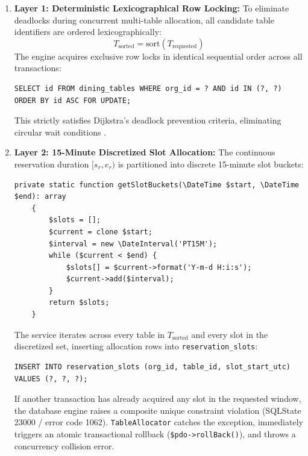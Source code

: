 \begin{enumerate}
    \item \textbf{Layer 1: Deterministic Lexicographical Row Locking:} To eliminate deadlocks during concurrent multi-table allocation, all candidate table identifiers are ordered lexicographically:
    \begin{equation}
        T_{\text{sorted}} = \text{sort}(T_{\text{requested}})
    \end{equation}
    The engine acquires exclusive row locks in identical sequential order across all transactions:
    \begin{lstlisting}[language=SQLANSI]
    SELECT id FROM dining_tables WHERE org_id = ? AND id IN (?, ?) ORDER BY id ASC FOR UPDATE;
    \end{lstlisting}
    This strictly satisfies Dijkstra's deadlock prevention criteria, eliminating circular wait conditions \parencite{bernstein1987concurrency}.
    \item \textbf{Layer 2: 15-Minute Discretized Slot Allocation:} The continuous reservation duration $[s_r, e_r)$ is partitioned into discrete 15-minute slot buckets:
    \begin{lstlisting}[language=PHPStrict, caption={15-minute slot discretization algorithm in \texttt{src/app/Services/TableAllocator.php}}, label={lst:slot_discretization}]
    private static function getSlotBuckets(\DateTime $start, \DateTime $end): array
    {
        $slots = [];
        $current = clone $start;
        $interval = new \DateInterval('PT15M');
        while ($current < $end) {
            $slots[] = $current->format('Y-m-d H:i:s');
            $current->add($interval);
        }
        return $slots;
    }
    \end{lstlisting}
    The service iterates across every table in $T_{\text{sorted}}$ and every slot in the discretized set, inserting allocation rows into \texttt{reservation\_slots}:
    \begin{lstlisting}[language=SQLANSI]
    INSERT INTO reservation_slots (org_id, table_id, slot_start_utc) VALUES (?, ?, ?);
    \end{lstlisting}
    If another transaction has already acquired any slot in the requested window, the database engine raises a composite unique constraint violation (SQLState 23000 / error code 1062). \texttt{TableAllocator} catches the exception, immediately triggers an atomic transactional rollback (\texttt{\$pdo->rollBack()}), and throws a concurrency collision error.
\end{enumerate}

